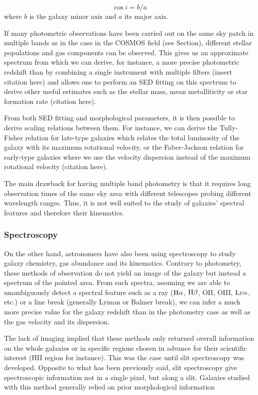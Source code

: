 \begin{equation}
	\cos i = b/a
\end{equation}
where $b$ is the galaxy minor axis and $a$ its major axis.

If many photometric observations have been carried out on the same sky patch in multiple bands as in the case in the COSMOS field (see Section), different stellar populations and gas components can be observed. This gives us an approximate spectrum from which we can derive, for instance, a more precise photometric redshift than by combining a single instrument with multiple filters (insert citation here) and allows one to perform an SED fitting on this spectrum to derive other useful estimates such as the stellar mass, mean metalliticity or star formation rate (citation here).

From both SED fitting and morphological parameters, it is then possible to derive scaling relations between them. For instance, we can derive the Tully-Fisher relation for late-type galaxies which relates the total luminosity of the galaxy with its maximum rotational velocity, or the Faber-Jackson relation for early-type galaxies where we use the velocity dispersion instead of the maximum rotational velocity (citation here).

The main drawback for having multiple band photometry is that it requires long observation times of the same sky area with different telescopes probing different wavelength ranges. Thus, it is not well suited to the study of galaxies' spectral features and therefore their kinematics.

\subsubsection{Spectroscopy}

On the other hand, astronomers have also been using spectroscopy to study galaxy chemistry, gas abundance and its kinematics. Contrary to photometry, these methods of observation do not yield an image of the galaxy but instead a spectrum of the pointed area. From such spectra, assuming we are able to unambiguously detect a spectral feature such as a ray ($\rm{H}{\alpha}$, $\rm{H}{\beta}$, OII, OIII, $\rm{Ly}\alpha$, etc.) or a line break (generally Lyman or Balmer break), we can infer a much more precise value for the galaxy redshift than in the photometry case as well as the gas velocity and its dispersion.

The lack of imaging implied that these methods only returned overall information on the whole galaxies or in specific regions chosen in advance for their scientific interest (HII region for instance). This was the case until slit spectroscopy was developed. Opposite to what has been previously said, slit spectroscopy give spectroscopic information not in a single pixel, but along a slit. Galaxies studied with this method generally relied on prior morphological information 

